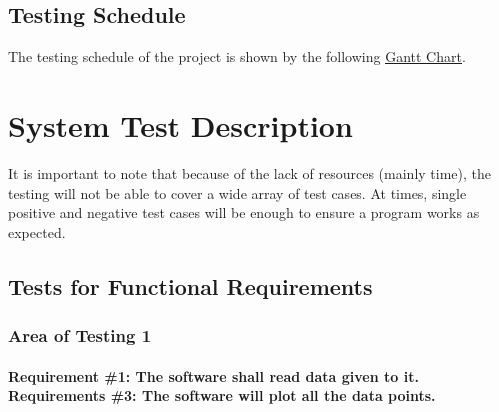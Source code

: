 \documentclass[12pt, titlepage]{article}
\begin{document}
\subsection{Testing Schedule}
The testing schedule of the project is shown by the following
 \href{run:../DevelopmentPlan/GanttChart.gan} {\underline{Gantt Chart}}.
\section{System Test Description}

It is important to note that because of the lack of resources (mainly time), the testing will not be able to cover a wide array of test cases. At times, single positive and negative test cases will be enough to ensure a program works as expected. 	
\subsection{Tests for Functional Requirements}

\subsubsection{Area of Testing 1}		
	\label{sec:3.1.1}
	\paragraph{Requirement \#1: The software shall read data given to it. \\ Requirements \#3: The software will plot all the data points.}
\end{document}
